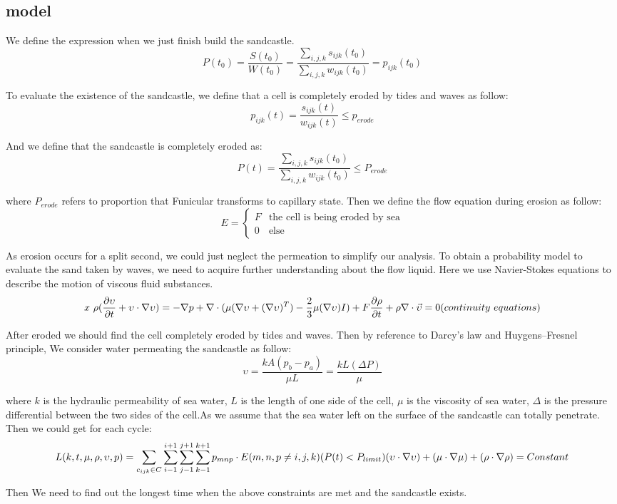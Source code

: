 \documentclass[12pt]{article}
\begin{document}
\subsection{model}
We define the expression when we just finish build the sandcastle.
$$  P(t_0) = \frac{S(t_0)}{W(t_0)} = \frac{\sum_{i,j,k}s_{ijk}(t_0)}{\sum_{i,j,k}w_{ijk}(t_0)} = p_{ijk}(t_0) $$
\par
To evaluate the existence of the sandcastle, we define that a cell is completely eroded by tides and waves as follow:
$$  p_{ijk}(t) = \frac{s_{ijk}(t)}{w_{ijk}(t)} \leq p_{erode} $$
\par
And we define that the sandcastle is completely eroded as:
$$  P(t) = \frac{\sum_{i,j,k}s_{ijk}(t_0)}{\sum_{i,j,k}w_{ijk}(t_0)} \leq P_{erode} $$
\par
where $P_{erode}$ refers to proportion that Funicular transforms to capillary state. Then we define the flow equation during erosion as follow:
$$	E=
    \begin{cases}
        F & \text{the cell is being eroded by sea} \\
        0 & \text{else}
    \end{cases}
$$
\par
As erosion occurs for a split second, we could just neglect the permeation to simplify our analysis. To obtain a probability model to evaluate the sand taken by waves, we need to acquire further understanding about the flow liquid. Here we use Navier-Stokes equations to describe the motion of viscous fluid substances.
$$
    x \rho(\frac{\partial \upsilon}{\partial t} + \upsilon \cdot \nabla \upsilon) = -\nabla p + \nabla \cdot(\mu(\nabla \upsilon+(\nabla \upsilon)^T)-\frac{2}{3}\mu(\nabla \upsilon)I)+F\\\frac{\partial \rho}{\partial t}+\rho\nabla\cdot\vec{\upsilon}=0(continuity \ equations)
$$
\par
After eroded we should find the cell completely eroded by tides and waves. Then by reference to Darcy's law and Huygens–Fresnel principle, We consider water permeating the sandcastle as follow:
$$
    \upsilon=\frac{kA(p_b-p_a)}{\mu L}=\frac{kL(\Delta P)}{\mu}
$$
\par
where $k$ is the hydraulic permeability of sea water, $L$ is the length of one side of the cell, $\mu$ is the viscosity of sea water, $\Delta$ is the pressure differential between the two sides of the cell.As we assume that the sea water left on the surface of the sandcastle can totally penetrate. Then we could get for each cycle:
$$
    L (k,t,\mu,\rho,\upsilon,p)=\sum_{c_{ijk}\in C}\sum_{i-1}^{i+1}\sum_{j-1}^{j+1}\sum_{k-1}^{k+1}{p_{mnp}\cdot E}(m,n,p \neq i,j,k)(P(t) <P_{limit})\\
    (\upsilon \cdot \nabla \upsilon)+(\mu \cdot \nabla \mu)+(\rho \cdot \nabla \rho) = Constant
$$
\par
Then We need to find out the longest time when the above constraints are met and the sandcastle exists.
\end{document}
